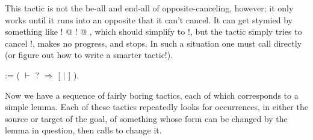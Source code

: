 \documentclass[12pt]{report}
\begin{document}
   This tactic is not the be-all and end-all of opposite-canceling,
   however; it only works until it runs into an opposite that it can't
   cancel.  It can get stymied by something like ! @ ! @ , which
   should simplify to !, but the tactic simply tries to cancel
   !, makes no progress, and stops.  In such a situation one must
   call   directly (or figure out how to write a
   smarter tactic!).  \begin{coqdoccode}
\coqdocemptyline
\coqdocnoindent
{}  :=\coqdoceol
\coqdocindent{1.00em}
  (\coqdoceol
\coqdocindent{2.00em}
  \coqdoceol
\coqdocindent{3.00em}
\ensuremath{\vdash} ?   \ensuremath{\Rightarrow}  [   \ensuremath{|}   ]\coqdoceol
\coqdocindent{2.00em}
\coqdoceol
\coqdocindent{1.00em}
).\coqdoceol
\coqdocemptyline
\end{coqdoccode}
Now we have a sequence of fairly boring tactics, each of which
   corresponds to a simple lemma.  Each of these tactics repeatedly
   looks for occurrences, in either the source or target of the goal,
   of something whose form can be changed by the lemma in question,
   then calls  to change it.
\end{document}
